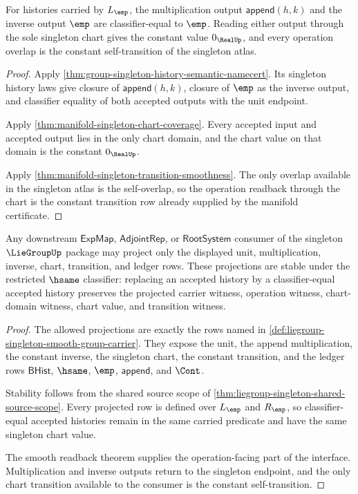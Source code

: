 \begin{theorem}
\label{thm:liegroup-singleton-smooth-operation-readback}
For histories carried by $L_{\emp}$, the multiplication output
$\mathsf{append}(h,k)$ and the inverse output $\emp$ are classifier-equal to
$\emp$. Reading either output through the sole singleton chart gives the
constant value $0_{\RealUp}$, and every operation overlap is the constant
self-transition of the singleton atlas.
\end{theorem}
\begin{proof}
Apply \autoref{thm:group-singleton-history-semantic-namecert}. Its singleton
history laws give closure of $\mathsf{append}(h,k)$, closure of $\emp$ as the
inverse output, and classifier equality of both accepted outputs with the unit
endpoint.

Apply \autoref{thm:manifold-singleton-chart-coverage}. Every accepted input and
accepted output lies in the only chart domain, and the chart value on that
domain is the constant $0_{\RealUp}$.

Apply \autoref{thm:manifold-singleton-transition-smoothness}. The only overlap
available in the singleton atlas is the self-overlap, so the operation readback
through the chart is the constant transition row already supplied by the
manifold certificate.
\end{proof}

\begin{theorem}
\label{thm:liegroup-singleton-dependent-interface-package}
Any downstream $\mathsf{ExpMap}$, $\mathsf{AdjointRep}$, or
$\mathsf{RootSystem}$ consumer of the
singleton $\LieGroupUp$ package may project only the displayed unit,
multiplication, inverse, chart, transition, and ledger rows. These projections
are stable under the restricted $\hsame$ classifier: replacing an accepted
history by a classifier-equal accepted history preserves the projected carrier
witness, operation witness, chart-domain witness, chart value, and transition
witness.
\end{theorem}
\begin{proof}
The allowed projections are exactly the rows named in
\autoref{def:liegroup-singleton-smooth-group-carrier}. They expose the unit,
the append multiplication, the constant inverse, the singleton chart, the
constant transition, and the ledger rows $\mathsf{BHist}$, $\hsame$, $\emp$,
$\mathsf{append}$, and $\Cont$.

Stability follows from the shared source scope of
\autoref{thm:liegroup-singleton-shared-source-scope}. Every projected row is
defined over $L_{\emp}$ and $R_{\emp}$, so classifier-equal accepted histories
remain in the same carried predicate and have the same singleton chart value.

The smooth readback theorem supplies the operation-facing part of the
interface. Multiplication and inverse outputs return to the singleton endpoint,
and the only chart transition available to the consumer is the constant
self-transition.
\end{proof}

